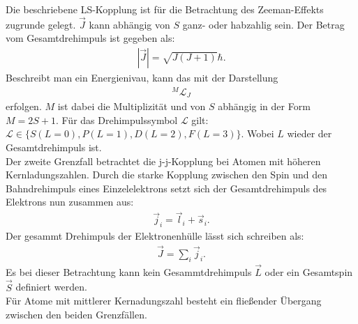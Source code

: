 Die beschriebene LS-Kopplung ist für die Betrachtung des Zeeman-Effekts zugrunde gelegt.
$\vec{J}$ kann abhängig von $S$ ganz- oder habzahlig sein.
Der Betrag vom Gesamtdrehimpuls ist gegeben als:
\begin{align*}
  |\vec{J}| = \sqrt{J(J+1)}\hbar.
\end{align*}
Beschreibt man ein Energienivau, kann das mit der Darstellung
\begin{align*}
  {}^M\mathcal{L}_J
\end{align*}
erfolgen.
$M$ ist dabei die Multiplizität und von $S$ abhängig in der Form $M=2S+1$.
Für das Drehimpulssymbol $\mathcal{L}$ gilt:
$\mathcal{L}\in\{S(L=0), P(L=1), D(L=2), F(L=3)\}$.
Wobei $L$ wieder der Gesamtdrehimpuls ist.\\
%
Der zweite Grenzfall betrachtet die j-j-Kopplung bei Atomen mit höheren Kernladungszahlen.
Durch die starke Kopplung zwischen den Spin und den Bahndrehimpuls eines Einzelelektrons setzt sich der Gesamtdrehimpuls des Elektrons nun zusammen aus:
\begin{align*}
  \vec{j}_i = \vec{l}_i + \vec{s}_i.
\end{align*}
Der gesammt Drehimpuls der Elektronenhülle lässt sich schreiben als:
\begin{align*}
  \vec{J}=\sum_i\vec{j}_i.
\end{align*}
Es bei dieser Betrachtung kann kein Gesammtdrehimpuls $\vec{L}$ oder ein Gesamtspin $\vec{S}$ definiert werden.\\
Für Atome mit mittlerer Kernadungszahl besteht ein fließender Übergang zwischen den beiden Grenzfällen.
\FloatBarrier

